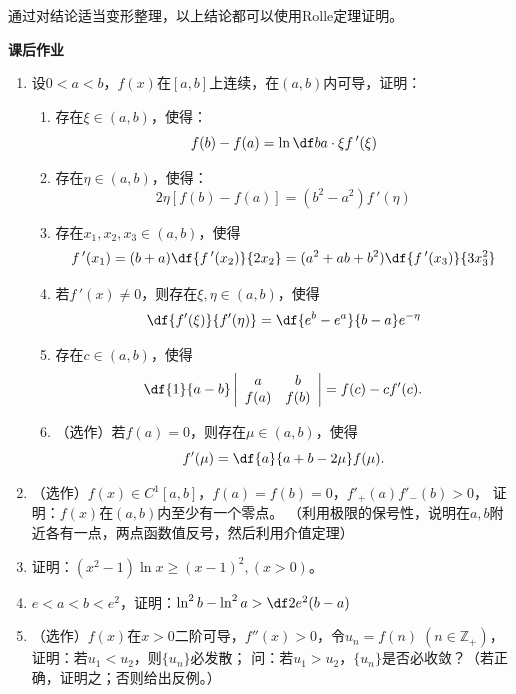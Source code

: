 通过对结论适当变形整理，以上结论都可以使用Rolle定理证明。

\begin{ext}
	{\bf 课后作业}
	
	\begin{enumerate}
	  \item 设$0<a<b$，$f(x)$在$[a,b]$上连续，在$(a,b)$内可导，证明：
		\begin{enumerate}[(1)]
		  \item 存在$\xi\in(a,b)$，使得：
			$$f(b)-f(a)=\ln\df ba\cdot \xi f\,'(\xi)$$
		  \item 存在$\eta\in(a,b)$，使得：
		    $$2\eta[f(b)-f(a)]=(b^2-a^2)f\,'(\eta)$$
		  \item 存在$x_1,x_2,x_3\in(a,b)$，使得
			$$f\,'(x_1)=(b+a)\df{f\,'(x_2)}{2x_2}=(a^2+ab+b^2)
			\df{f\,'(x_3)}{3x_3^2}$$ 
		  \item 若$f\,'(x)\ne 0$，则存在$\xi,\eta\in(a,b)$，使得
			$$\df{f'(\xi)}{f'(\eta)}=\df{e^b-e^a}{b-a}e^{-\eta}$$
		  \item 存在$c\in(a,b)$，使得
			$$\df{1}{a-b}\left|\begin{array}{cc}
			a & b\\ f(a) & f(b)
			\end{array}\right|=f(c)-cf'(c).$$
		  \item （选作）若$f(a)=0$，则存在$\mu\in(a,b)$，使得
		  $$f'(\mu)=\df{a}{a+b-2\mu}f(\mu).$$
		\end{enumerate}
	  \item （选作）$f(x)\in C^1[a,b]$，$f(a)=f(b)=0$，$f'_+(a)f'_-(b)>0$，
	  证明：$f(x)$在$(a,b)$内至少有一个零点。
	  （利用极限的保号性，说明在$a,b$附近各有一点，两点函数值反号，然后利用介值定理）
	  \item 证明：$(x^2-1)\ln x\geq(x-1)^2,(x>0)$。
	  \item $e<a<b<e^2$，证明：$\ln^2b-\ln^2a>\df2{e^2}(b-a)$
	  \item （选作）$f(x)$在$x>0$二阶可导，$f''(x)>0$，令$u_n=f(n)\;
	  (n\in\mathbb{Z}_+)$，证明：若$u_1<u_2$，则$\{u_n\}$必发散；
	  问：若$u_1>u_2$，$\{u_n\}$是否必收敛？（若正确，证明之；否则给出反例。）
	\end{enumerate}
\end{ext}

